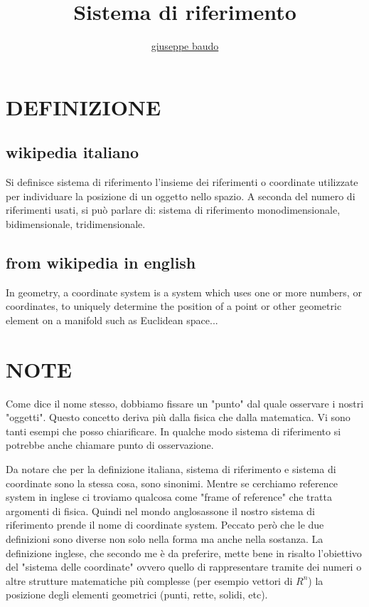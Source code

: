 \documentclass[a4paper,10pt]{article}
\title{Sistema di riferimento}
\author{\href{http://www.baudo.hol.es}{giuseppe baudo}}
\begin{document}
\maketitle

\section{DEFINIZIONE}

\subsection{wikipedia italiano}
Si definisce sistema di riferimento l'insieme dei riferimenti o coordinate utilizzate per individuare la posizione di un oggetto
nello spazio. A seconda del numero di riferimenti usati, si può parlare di: sistema di riferimento monodimensionale, bidimensionale, tridimensionale.

\subsection{from wikipedia in english}
In geometry, a coordinate system is a system which uses one or more numbers, or coordinates, to uniquely determine the position of
a point or other geometric element on a manifold such as Euclidean space...


\section{NOTE}
Come dice il nome stesso, dobbiamo fissare un "punto" dal quale osservare i nostri "oggetti". Questo concetto deriva più dalla fisica
che dalla matematica. Vi sono tanti esempi che posso chiarificare. In qualche modo sistema di riferimento si potrebbe anche chiamare
punto di osservazione.

Da notare che per la definizione italiana, sistema di riferimento e sistema di coordinate sono la stessa cosa, sono sinonimi. Mentre
se cerchiamo reference system in inglese ci troviamo qualcosa come "frame of reference" che tratta argomenti di fisica. Quindi nel mondo
anglosassone il nostro sistema di riferimento prende il nome di coordinate system. Peccato però che le due definizioni sono diverse
non solo nella forma ma anche nella sostanza. La definizione inglese, che secondo me è da preferire, mette bene in risalto l'obiettivo
del "sistema delle coordinate" ovvero quello di rappresentare tramite dei numeri o altre strutture matematiche più complesse (per esempio vettori di $R^n$) la 
posizione degli elementi geometrici (punti, rette, solidi, etc).
\end{document}
